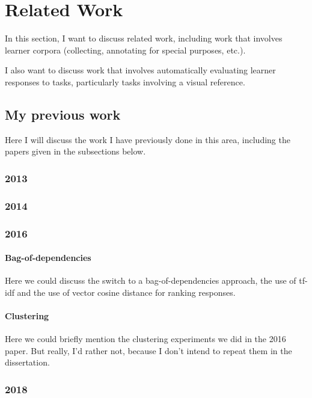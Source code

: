 \chapter{Related Work}

In this section, I want to discuss related work, including work that involves learner corpora (collecting, annotating for special purposes, etc.).

I also want to discuss work that involves automatically evaluating learner responses to tasks, particularly tasks involving a visual reference.

\section{My previous work}
Here I will discuss the work I have previously done in this area, including the papers given in the subsections below.

\subsection{2013}
\cite{king:dickinson:13}

\subsection{2014}
\citet{king:dickinson:14}

\subsection{2016}
\citep{king:dickinson:16}

\subsubsection{Bag-of-dependencies}
Here we could discuss the switch to a bag-of-dependencies approach, the use of tf-idf and the use of vector cosine distance for ranking responses.

\subsubsection{Clustering}
Here we could briefly mention the clustering experiments we did in the 2016 paper. But really, I'd rather not, because I don't intend to repeat them in the dissertation.

\subsection{2018}
\cite{king:dickinson:18}


